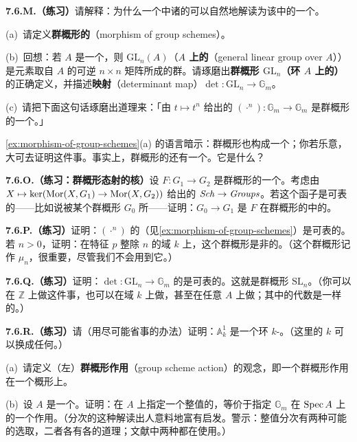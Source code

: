 \textbf{7.6.M.（练习）}\quad 请解释：为什么一个\trCategory{}中诸\trGroupObject{}的\trProduct{}可以自然地解读为该\trCategory{}中的一个\trGroupObject{}。

\begin{exercise}\label{ex:morphism-of-group-schemes}
(a)~请定义\textbf{群概形的\trMorphism}（morphism of group schemes）。

(b)~回想：若 $A$ 是一个\trRing，则 $\mathrm{GL}_n(A)$（\textbf{$A$ 上的\trGeneralLinearGroup{}}（general linear group over $A$））是元素取自\trRing{} $A$ 的可逆 $n\times n$ 矩阵所成的群。请琢磨出\textbf{群概形 $\mathrm{GL}_n$（环 $A$ 上的）}的正确定义，并描述\textbf{\trDeterminant{}映射}（determinant map）$\det\colon\mathrm{GL}_n\to\mathbb{G}_m$。

(c)~请把下面这句话琢磨出道理来：「由 $t\mapsto t^n$ 给出的 $(\cdot^{n})\colon\mathbb{G}_m\to\mathbb{G}_m$ 是群概形的一个\trMorphism。」
\end{exercise}

\cref{ex:morphism-of-group-schemes}(a) 的语言暗示：群概形也构成一个\trCategory；你若乐意，大可去证明这件事。事实上，群概形的\trCategory{}还有一个\trZeroObject。它是什么？

\textbf{7.6.O.（练习：群概形态射的核）}\quad 设 $F\colon G_1\to G_2$ 是群概形的一个\trMorphism。考虑由 $X\mapsto\ker(\operatorname{Mor}(X,G_1)\to\operatorname{Mor}(X,G_2))$ 给出的\trContravariantFunctor{} $\mathit{Sch}\to\mathit{Groups}$。若这个函子是可表的——比如说被某个群概形 $G_0$ 所\trRepresentation——证明：$G_0\to G_1$ 是 $F$ 在群概形的\trCategory{}中的\trKernel。

\textbf{7.6.P.（练习）}\quad 证明：$(\cdot^{n})$ 的\trKernel{}（见\cref{ex:morphism-of-group-schemes}）是可表的。若 $n>0$，证明：在特征 $p$ 整除 $n$ 的域 $k$ 上，这个群概形是非\trReduced{}的。（这个群概形记作 $\mu_n$，很重要，尽管我们不会用到它。）

\textbf{7.6.Q.（练习）}\quad 证明：$\det\colon\mathrm{GL}_n\to\mathbb{G}_m$ 的\trKernel{}是可表的。这就是群概形 $\mathrm{SL}_n$。（你可以在 $\mathbb{Z}$ 上做这件事，也可以在域 $k$ 上做，甚至在任意\trRing{} $A$ 上做；其中的代数是一样的。）

\textbf{7.6.R.（练习）}\quad 请（用尽可能省事的办法）证明：$\mathbb{A}^1_k$ 是一个环 $k$-\trScheme。（这里的 $k$ 可以换成任何\trRing。）

\begin{exercise}\label{ex:group-scheme-action}
(a)~请定义（左）\textbf{群概形作用}（group scheme action）的观念，即一个群概形作用在一个概形上。

(b)~设 $A$ 是一个\trRing。证明：在 $A$ 上指定一个整值的\trGrading，等价于指定 $\mathbb{G}_m$ 在 $\operatorname{Spec} A$ 上的一个作用。（分次的这种解读出人意料地富有启发。警示：整值分次有两种可能的选取，二者各有各的道理；文献中两种都在使用。）
\end{exercise}

